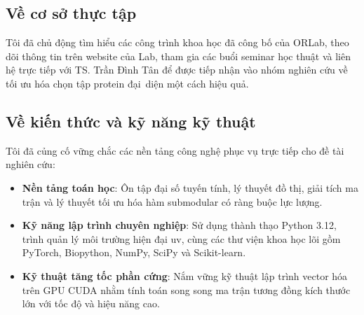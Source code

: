 \subsection{Về cơ sở thực tập}
Tôi đã chủ động tìm hiểu các công trình khoa học đã công bố của ORLab, theo dõi thông tin trên website của Lab, tham gia các buổi seminar học thuật và liên hệ trực tiếp với TS. Trần Đình Tân để được tiếp nhận vào nhóm nghiên cứu về tối ưu hóa chọn tập protein đại~diện một cách hiệu quả.

\subsection{Về kiến thức và kỹ năng kỹ thuật}
Tôi đã củng cố vững chắc các nền tảng công nghệ phục vụ trực tiếp cho đề tài nghiên cứu:
\begin{itemize}[itemsep=1pt, parsep=0pt, topsep=2pt]
    \item \textbf{Nền tảng toán học}: Ôn tập đại số tuyến tính, lý thuyết đồ thị, giải tích ma trận và lý thuyết tối ưu hóa hàm submodular có ràng buộc lực lượng.
    \item \textbf{Kỹ năng lập trình chuyên nghiệp}: Sử dụng thành thạo Python 3.12, trình quản lý môi trường hiện đại uv, cùng các thư viện khoa học lõi gồm PyTorch, Biopython, NumPy, SciPy và Scikit-learn.
    \item \textbf{Kỹ thuật tăng tốc phần cứng}: Nắm vững kỹ thuật lập trình vector hóa trên GPU CUDA nhằm tính toán song song ma trận tương đồng kích thước lớn với tốc độ và hiệu năng cao.
\end{itemize}
